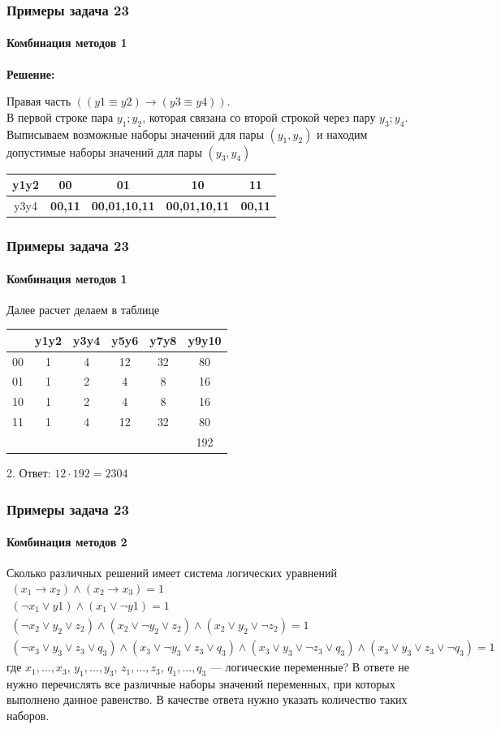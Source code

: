 \begin{frame}[t]
\frametitle{Примеры задача 23}
\framesubtitle{Комбинация методов 1}

\textbf{Решение: }

Правая часть $((y1 \equiv y2)\rightarrow(y3 \equiv y4))$.\\
В первой строке пара $y_1;y_2$, которая связана со второй строкой через пару $y_3;y_4$.\\
Выписываем возможные наборы значений для пары $(y_1,y_2)$ и находим допустимые наборы значений для пары $(y_3,y_4)$ \\ 	\pause 
\begin{tabular}{|c|c|c|c|c|}
\hline 
y1y2 & 00 & 01 & 10 & 11\tabularnewline
\hline 
\hline 
y3y4 & \textbf{00,11} & \textbf{00,01,10,11} & \textbf{00,01,10,11} & \textbf{00,11}\tabularnewline
\hline 
\end{tabular} 	
\end{frame}

\begin{frame}[t]
\frametitle{Примеры задача 23}
\framesubtitle{Комбинация методов 1}

Далее расчет делаем в таблице\\
\begin{tabular}{|c|c|c|c|c|c|}
\hline 
& y1y2 & y3y4 & y5y6 & y7y8 & y9y10 \tabularnewline
\hline 
00 & 1 & 4 & 12 & 32 & 80 \tabularnewline
\hline 
01 & 1 & 2 & 4 &   8 & 16  \tabularnewline
\hline
10 & 1 & 2 & 4 &   8 & 16 \tabularnewline
\hline 
11 & 1 & 4 & 12 & 32 & 80 \tabularnewline
\hline 
   &   &   &  &  & 192 \tabularnewline
\hline	
\end{tabular}

2. Ответ: $12\cdot 192=2304$
\end{frame}

\begin{frame}[t]
\frametitle{Примеры задача 23}
\framesubtitle{Комбинация методов 2}
Сколько различных решений имеет система логических уравнений 
\scriptsize
\begin{align*}
(x_1 \rightarrow x_2) \wedge (x_2 \rightarrow x_3) = 1\\
(\neg x_1 \vee y1) \wedge (x_1 \vee \neg y1) = 1\\
(\neg x_2 \vee y_2 \vee z_2) \wedge (x_2 \vee \neg y_2 \vee z_2) \wedge (x_2 \vee y_2 \vee \neg z_2) = 1\\
(\neg x_3\vee y_3\vee z_3 \vee q_3) \wedge (x_3\vee \neg y_3 \vee z_3\vee q_3) \wedge (x_3\vee y_3\vee \neg z_3\vee q_3) \wedge (x_3\vee y_3\vee z_3\vee \neg q_3) = 1
\end{align*}	
\normalsize
где $x_1, \ldots, x_{3}$, $y_1, \ldots, y_{3}$, $z_1, \ldots, z_{3}$, $q_1, \ldots, q_{3}$ --- логические переменные? В ответе не нужно перечислять все различные наборы значений переменных, при которых выполнено данное равенство. В качестве ответа нужно указать количество таких наборов.
\end{frame}

